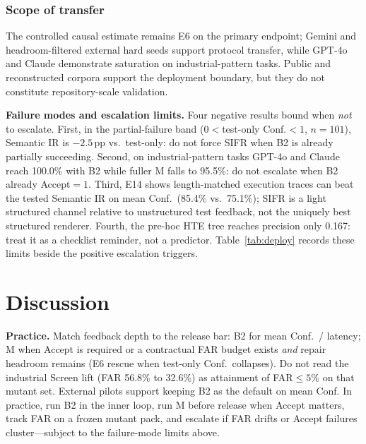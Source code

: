 \documentclass[10pt,conference]{IEEEtran}
\newcommand{\runin}[1]{\medskip\noindent\textbf{#1}\enspace}
\begin{document}
\subsubsection{Scope of transfer}
The controlled causal estimate remains E6 on the primary endpoint; Gemini
and headroom-filtered external hard seeds support protocol transfer, while
GPT-4o and Claude demonstrate saturation on industrial-pattern tasks.
Public and reconstructed
corpora support the deployment boundary, but they do not constitute
repository-scale validation.

\runin{Failure modes and escalation limits.}
Four negative results bound when \emph{not} to escalate.
First, in the partial-failure band ($0{<}$test-only Conf.${<}1$, $n{=}101$),
Semantic IR is ${-}2.5$\,pp vs.\ test-only: do not force SIFR when B2 is
already partially succeeding.
Second, on industrial-pattern tasks GPT-4o and Claude reach 100.0\% with B2
while fuller M falls to 95.5\%: do not escalate when B2 already Accept${=}1$.
Third, E14 shows length-matched execution traces can beat the tested Semantic
IR on mean Conf.\ (85.4\% vs.\ 75.1\%); SIFR is a light structured channel
relative to unstructured test feedback, not the uniquely best structured
renderer.
Fourth, the pre-hoc HTE tree reaches precision only 0.167: treat it as a
checklist reminder, not a predictor.
Table~\ref{tab:deploy} records these limits beside the positive escalation
triggers.

\section{Discussion}
\runin{Practice.}
Match feedback depth to the release bar: B2 for mean Conf.\ / latency; M when
Accept is required or a contractual FAR budget exists \emph{and} repair
headroom remains (E6 rescue when test-only Conf.\ collapses).
Do not read the industrial Screen lift (FAR 56.8\% to 32.6\%) as attainment of
FAR${\le}5\%$ on that mutant set.
External pilots support keeping B2 as the default on mean Conf.
In practice, run B2 in the inner loop, run M before release when Accept
matters, track FAR on a frozen mutant pack, and escalate if FAR drifts or
Accept failures cluster---subject to the failure-mode limits above.
\end{document}
